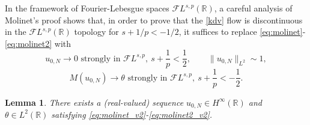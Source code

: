 \documentclass[%
11pt,  reqno]{amsart}
\newcommand{\5}{\textup{V}}
\newtheorem{lemma}[theorem]{Lemma}
\theoremstyle{remark}
\newcommand{\R}{\mathbb{R}}
\numberwithin{equation}{section}
\numberwithin{theorem}{section}
\begin{document}
In the framework of Fourier-Lebesgue spaces $\mathcal{F}L^{s,p}(\R)$, a careful analysis of Molinet's proof shows that, in order to prove that the \eqref{kdv} flow is discontinuous in the $\mathcal{F}L^{s,p}(\R)$ topology for $s+1/p<-1/2$, it suffices to replace \eqref{eq:molinet}-\eqref{eq:molinet2} with
\begin{equation}\label{eq:molinet_v2}
	u_{0,N}\to 0 \mbox{ strongly in }\mathcal{F}L^{s,p},\ s+\frac1p<\frac12,\qquad \|u_{0,N}\|_{L^2}\sim 1,
\end{equation}
\begin{equation}\label{eq:molinet2_v2}
 M(u_{0,N}) \to \theta \mbox{ strongly in }\mathcal{F}L^{s,p}, \ s+\frac1p<-\frac12.
\end{equation}
\begin{lemma}
	There exists a (real-valued) sequence $u_{0,N}\in H^\infty(\R)$ and $\theta\in L^2(\R)$ satisfying \eqref{eq:molinet_v2}-\eqref{eq:molinet2_v2}.
\end{lemma}
\end{document}
